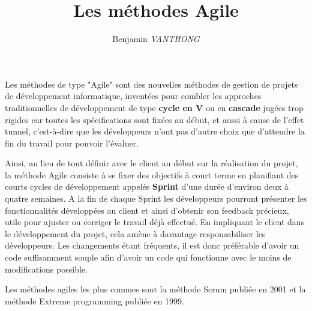 \documentclass[12pt]{article}
\title {Les méthodes Agile}
\author {Benjamin \emph{VANTHONG}}
\begin{document}
\maketitle 
Les méthodes de type "Agile" sont des nouvelles méthodes de gestion de projets de développement informatique, inventées pour combler les approches traditionnelles de développement de type \textbf{cycle en V} ou en \textbf{cascade} jugées trop rigides car toutes les spécifications sont fixées au début, et aussi à cause de l'effet tunnel, c'est-à-dire que les développeurs n'ont pas d'autre choix que d'attendre la fin du travail pour pouvoir l'évaluer.\newline 

Ainsi, au lieu de tout définir avec le client au début sur la réalisation du projet, la méthode Agile consiste à se fixer des objectifs à court terme en planifiant des courts cycles de développement appelés \textbf{Sprint} d'une durée d'environ deux à quatre semaines. A la fin de chaque Sprint les développeurs pourront présenter les fonctionnalités développées au client et ainsi d'obtenir son feedback précieux, utile pour ajuster ou corriger le travail déjà effectué. En impliquant le client dans le développement du projet, cela amène à davantage responsabiliser les développeurs. Les changements étant fréquents, il est donc préférable d'avoir un code suffisamment souple afin d'avoir un code qui fonctionne avec le moins de modifications possible.\newline
 
Les méthodes agiles les plus connues sont la méthode Scrum publiée en 2001 et la méthode Extreme programming publiée en 1999.
\end{document}
